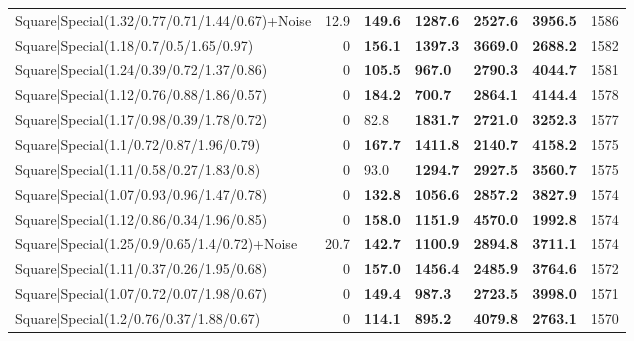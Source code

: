 \begin{tabular}{lrllllr}
 Square|Special(1.32/0.77/0.71/1.44/0.67)+Noise                &            12.9 & \textbf{149.6} & \textbf{1287.6} & \textbf{2527.6} & \textbf{3956.5} &         1586 \\
 Square|Special(1.18/0.7/0.5/1.65/0.97)                        &             0   & \textbf{156.1} & \textbf{1397.3} & \textbf{3669.0} & \textbf{2688.2} &         1582 \\
 Square|Special(1.24/0.39/0.72/1.37/0.86)                      &             0   & \textbf{105.5} & \textbf{967.0}  & \textbf{2790.3} & \textbf{4044.7} &         1581 \\
 Square|Special(1.12/0.76/0.88/1.86/0.57)                      &             0   & \textbf{184.2} & \textbf{700.7}  & \textbf{2864.1} & \textbf{4144.4} &         1578 \\
 Square|Special(1.17/0.98/0.39/1.78/0.72)                      &             0   & 82.8           & \textbf{1831.7} & \textbf{2721.0} & \textbf{3252.3} &         1577 \\
 Square|Special(1.1/0.72/0.87/1.96/0.79)                       &             0   & \textbf{167.7} & \textbf{1411.8} & \textbf{2140.7} & \textbf{4158.2} &         1575 \\
 Square|Special(1.11/0.58/0.27/1.83/0.8)                       &             0   & 93.0           & \textbf{1294.7} & \textbf{2927.5} & \textbf{3560.7} &         1575 \\
 Square|Special(1.07/0.93/0.96/1.47/0.78)                      &             0   & \textbf{132.8} & \textbf{1056.6} & \textbf{2857.2} & \textbf{3827.9} &         1574 \\
 Square|Special(1.12/0.86/0.34/1.96/0.85)                      &             0   & \textbf{158.0} & \textbf{1151.9} & \textbf{4570.0} & \textbf{1992.8} &         1574 \\
 Square|Special(1.25/0.9/0.65/1.4/0.72)+Noise                  &            20.7 & \textbf{142.7} & \textbf{1100.9} & \textbf{2894.8} & \textbf{3711.1} &         1574 \\
 Square|Special(1.11/0.37/0.26/1.95/0.68)                      &             0   & \textbf{157.0} & \textbf{1456.4} & \textbf{2485.9} & \textbf{3764.6} &         1572 \\
 Square|Special(1.07/0.72/0.07/1.98/0.67)                      &             0   & \textbf{149.4} & \textbf{987.3}  & \textbf{2723.5} & \textbf{3998.0} &         1571 \\
 Square|Special(1.2/0.76/0.37/1.88/0.67)                       &             0   & \textbf{114.1} & \textbf{895.2}  & \textbf{4079.8} & \textbf{2763.1} &         1570 \\

\end{tabular}

